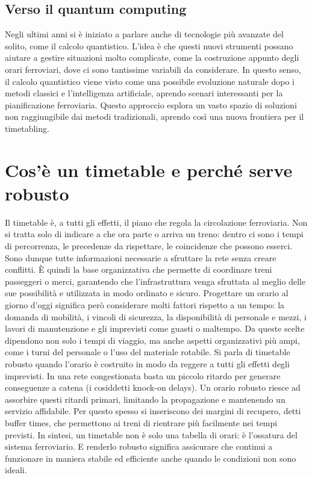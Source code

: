 \documentclass[a4paper,12pt]{report}
\begin{document}
\subsection{Verso il quantum computing}
Negli ultimi anni si è iniziato a parlare anche di tecnologie più avanzate del solito, come il calcolo quantistico. L’idea è che questi nuovi strumenti possano aiutare a gestire situazioni molto complicate, come la costruzione appunto degli orari ferroviari, dove ci sono tantissime variabili da considerare. In questo senso, il calcolo quantistico viene visto come una possibile evoluzione naturale dopo i metodi classici e l’intelligenza artificiale, aprendo scenari interessanti per la pianificazione ferroviaria.
Questo approccio esplora un vasto spazio di soluzioni non raggiungibile dai metodi tradizionali, aprendo così una nuova frontiera per il timetabling.


\section{Cos’è un timetable e perché serve robusto}
Il timetable è, a tutti gli effetti, il piano che regola la circolazione ferroviaria. Non si tratta solo di indicare a che ora parte o arriva un treno: dentro ci sono i tempi di percorrenza, le precedenze da rispettare, le coincidenze che possono esserci. Sono dunque tutte informazioni necessarie a sfruttare la rete senza creare conflitti. 
È quindi la base organizzativa che permette di coordinare treni passeggeri o merci, garantendo che l’infrastruttura venga sfruttata al meglio delle sue possibilità e utilizzata in modo ordinato e sicuro.
Progettare un orario al giorno d'oggi significa però considerare molti fattori rispetto a un tempo: la domanda di mobilità, i vincoli di sicurezza, la disponibilità di personale e mezzi, i lavori di manutenzione e gli imprevisti come guasti o maltempo. Da queste scelte dipendono non solo i tempi di viaggio, ma anche aspetti organizzativi più ampi, come i turni del personale o l’uso del materiale rotabile.
Si parla di timetable robusto quando l’orario è costruito in modo da reggere a tutti gli effetti degli imprevisti. In una rete congestionata basta un piccolo ritardo per generare conseguenze a catena (i cosiddetti knock-on delays). Un orario robusto riesce ad assorbire questi ritardi primari, limitando la propagazione e mantenendo un servizio affidabile. Per questo spesso si inseriscono dei margini di recupero, detti buffer times, che permettono ai treni di rientrare più facilmente nei tempi previsti.
In sintesi, un timetable non è solo una tabella di orari: è l’ossatura del sistema ferroviario. E renderlo robusto significa assicurare che continui a funzionare in maniera stabile ed efficiente anche quando le condizioni non sono ideali.
\end{document}
